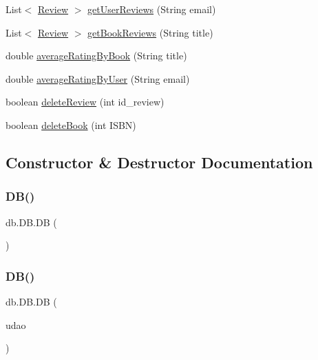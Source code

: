 \begin{DoxyCompactItemize}
\item 
List$<$ \hyperlink{classserver_1_1data_1_1_review}{Review} $>$ \hyperlink{classdb_1_1_d_b_a9ef4c302b91da17852f09a27a90fb4b5}{get\+User\+Reviews} (String email)
\item 
List$<$ \hyperlink{classserver_1_1data_1_1_review}{Review} $>$ \hyperlink{classdb_1_1_d_b_a02a42ee97d8e7189733dfc720a05452e}{get\+Book\+Reviews} (String title)
\item 
double \hyperlink{classdb_1_1_d_b_a8b2b9d6c4aabb17719e2d2af4cf7ba74}{average\+Rating\+By\+Book} (String title)
\item 
double \hyperlink{classdb_1_1_d_b_a38091677ae1e964a84320d6e539ea62e}{average\+Rating\+By\+User} (String email)
\item 
boolean \hyperlink{classdb_1_1_d_b_ab3664756678e77a9f1b9c6c93c81d691}{delete\+Review} (int id\+\_\+review)
\item 
boolean \hyperlink{classdb_1_1_d_b_a712d418878efa15112c62eb6db4b022d}{delete\+Book} (int I\+S\+BN)
\end{DoxyCompactItemize}


\subsection{Constructor \& Destructor Documentation}
\mbox{\label{classdb_1_1_d_b_a1f91d243772e38f908a993724eb01243}} 
\subsubsection{\texorpdfstring{D\+B()}{DB()}\hspace{0.1cm}{\footnotesize\ttfamily [1/2]}}
{\footnotesize\ttfamily db.\+D\+B.\+DB (\begin{DoxyParamCaption}{ }\end{DoxyParamCaption})}

\mbox{\label{classdb_1_1_d_b_afdc419eebbdef14244d859ac59d19dc7}} 
\subsubsection{\texorpdfstring{D\+B()}{DB()}\hspace{0.1cm}{\footnotesize\ttfamily [2/2]}}
{\footnotesize\ttfamily db.\+D\+B.\+DB (\begin{DoxyParamCaption}\item[{\hyperlink{interfacedb_1_1_i_d_a_o}{I\+D\+AO}}]{udao }\end{DoxyParamCaption})}



